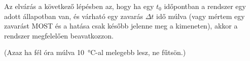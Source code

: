 Az elvárás a következő lépésben az, hogy ha egy $t_0$ időpontban a rendszer egy adott állapotban van, és várható egy zavarás $\Delta t$ idő múlva (vagy mértem egy zavarást MOST és a hatása csak később jelenne meg a kimeneten), akkor a rendszer megfelelően beavatkozzon.

(Azaz ha fél óra múlva \SI{10}{\celsius}-al melegebb lesz, ne fűtsön.)